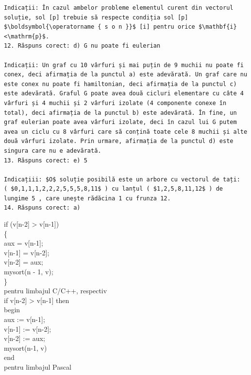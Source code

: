 \documentclass[10pt]{article}
\begin{document}
\begin{verbatim}
Indicații: În cazul ambelor probleme elementul curent din vectorul soluție, sol [p] trebuie să respecte condiția sol [p] $\boldsymbol{\operatorname { s o n }}$ [i] pentru orice $\mathbf{i}<\mathrm{p}$.
12. Răspuns corect: d) G nu poate fi eulerian

Indicații: Un graf cu 10 vârfuri și mai puțin de 9 muchii nu poate fi conex, deci afirmația de la punctul a) este adevărată. Un graf care nu este conex nu poate fi hamiltonian, deci afirmația de la punctul c) este adevărată. Graful G poate avea două cicluri elementare cu câte 4 vârfuri și 4 muchii și 2 vârfuri izolate (4 componente conexe în total), deci afirmația de la punctul b) este adevărată. În fine, un graf eulerian poate avea vârfuri izolate, deci în cazul lui G putem avea un ciclu cu 8 vârfuri care să conțină toate cele 8 muchii și alte două vârfuri izolate. Prin urmare, afirmația de la punctul d) este singura care nu e adevărată.
13. Răspuns corect: e) 5

Indicațiii: $O$ soluție posibilă este un arbore cu vectorul de tați:
( $0,1,1,1,2,2,2,5,5,5,8,11$ ) cu lanțul ( $1,2,5,8,11,12$ ) de lungime 5 , care unește rădăcina 1 cu frunza 12.
14. Răspuns corect: a)
\end{verbatim}

if (v[n-2] > v[n-1])\\
\{\\[0pt]
aux = v[n-1];\\[0pt]
v[n-1] = v[n-2];\\[0pt]
v[n-2] = aux;\\
mysort(n - 1, v);\\
\}\\
pentru limbajul C/C++, respectiv\\[0pt]
if v[n-2] > v[n-1] then\\
begin\\[0pt]
aux := v[n-1];\\[0pt]
v[n-1] := v[n-2];\\[0pt]
v[n-2] := aux;\\
mysort(n-1, v)\\
end\\
pentru limbajul Pascal
\end{document}
